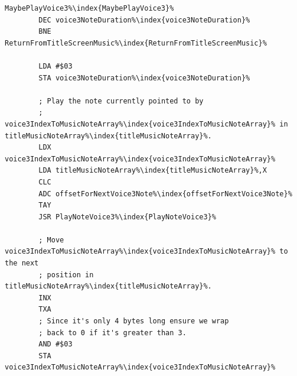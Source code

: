\begin{lstlisting}[caption= \icode{MaybePlayVoice3\index{MaybePlayVoice3}}\, part of \icode{PlayTitleScreenMusic\index{PlayTitleScreenMusic}}.,escapechar=\%]
MaybePlayVoice3%\index{MaybePlayVoice3}%   
        DEC voice3NoteDuration%\index{voice3NoteDuration}%
        BNE ReturnFromTitleScreenMusic%\index{ReturnFromTitleScreenMusic}%

        LDA #$03
        STA voice3NoteDuration%\index{voice3NoteDuration}%

        ; Play the note currently pointed to by 
        ; voice3IndexToMusicNoteArray%\index{voice3IndexToMusicNoteArray}% in titleMusicNoteArray%\index{titleMusicNoteArray}%.
        LDX voice3IndexToMusicNoteArray%\index{voice3IndexToMusicNoteArray}%
        LDA titleMusicNoteArray%\index{titleMusicNoteArray}%,X
        CLC
        ADC offsetForNextVoice3Note%\index{offsetForNextVoice3Note}%
        TAY
        JSR PlayNoteVoice3%\index{PlayNoteVoice3}%

        ; Move voice3IndexToMusicNoteArray%\index{voice3IndexToMusicNoteArray}% to the next
        ; position in titleMusicNoteArray%\index{titleMusicNoteArray}%.
        INX
        TXA
        ; Since it's only 4 bytes long ensure we wrap
        ; back to 0 if it's greater than 3.
        AND #$03
        STA voice3IndexToMusicNoteArray%\index{voice3IndexToMusicNoteArray}%
\end{lstlisting}
\clearpage
